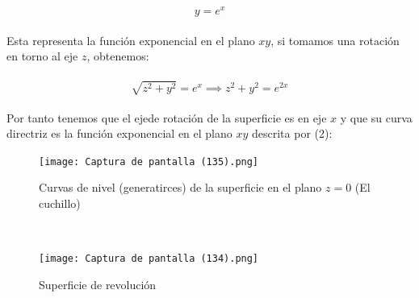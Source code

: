 \documentclass[11pt,letterpaper]{article}
\begin{document}
     \begin{equation}
        y=e^x
     \end{equation}\,\\
     Esta representa la funci\'on exponencial en el plano $xy$, si tomamos una rotaci\'on en torno al eje $z$, obtenemos:\,\\
     \,\\
     \begin{equation*}
        \sqrt{z^2+y^2}=e^x\implies z^2+y^2=e^{2x}
     \end{equation*}\,\\
     Por tanto tenemos que el ejede rotaci\'on de la superficie es en eje $x$ y que su curva directriz es la funci\'on exponencial
     en el plano $xy$ descrita por (2):
     
     \begin{figure}
     \centering
    \texttt{[image: Captura de pantalla (135).png]}
    \caption{Curvas de nivel (generatirces) de la superficie en el plano $z=0$ (El cuchillo)}
    \label{Cono rebanado}
     \end{figure}\,\\

     \begin{figure}
        \centering
        \texttt{[image: Captura de pantalla (134).png]}
        \caption{Superficie de revoluci\'on}
        \label{Cono rebanado}
        \newpage
     \end{figure}\,\\
\newpage
\end{document}
